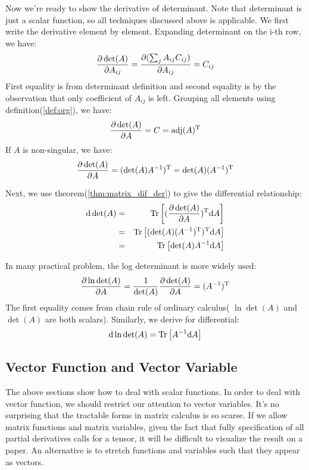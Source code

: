 Now we're ready to show the derivative of determinant. Note that determinant
is just a scalar function, so all techniques discussed above is applicable. 
We first write the derivative element by element. Expanding determinant
on the i-th row, we have:
\begin{equation}
	\dfrac{\partial \det(A)}{\partial A_{ij}} = \dfrac{\partial (\sum_{j}{A_{ij}C_{ij}})}{\partial A_{ij}} = C_{ij}
\end{equation}
First equality is from determinant definition and second equality is 
by the observation that only coefficient of $A_{ij}$ is left. Grouping all 
elements using definition(\ref{def:org}), we have:
\begin{equation}
	\dfrac{\partial \det(A)}{\partial A} = C = \mathrm{adj}(A)^\mathrm{T}
\end{equation}
If $A$ is non-singular, we have:
\begin{equation}
	\dfrac{\partial \det(A)}{\partial A} = (\det(A)A^{-1})^\mathrm{T} =\det(A)(A^{-1})^\mathrm{T} 
\end{equation}

Next, we use theorem(\ref{thm:matrix_dif_der}) to give the differential 
relationship:
\begin{eqnarray}
	\mathrm{d}\det(A) &=& \mathrm{Tr}\left[ (\dfrac{\partial \det(A)}{\partial A})^\mathrm{T} \mathrm{d}A\right] \\
	&=& \mathrm{Tr}\left[ ( \det(A)(A^{-1})^\mathrm{T}  )^\mathrm{T} \mathrm{d}A\right] \\
	&=& \mathrm{Tr}\left[ \det(A)A^{-1}  \mathrm{d}A\right]
\end{eqnarray}

In many practical problem, the log determinant is more widely used:
\begin{eqnarray}
	\dfrac{\partial \ln \det(A)}{\partial A} = \frac{1}{\det(A)} \dfrac{\partial \det(A)}{\partial A} = (A^{-1})^\mathrm{T}
\end{eqnarray}
The first equality comes from chain rule of ordinary calculus(
$\ln \det(A)$ and $\det(A)$ are both scalars). Similarly, we derive
for differential:
\begin{equation}
	\mathrm{d}\ln \det(A) = \mathrm{Tr}\left[ A^{-1}  \mathrm{d}A\right]
\end{equation}
	

\subsection{Vector Function and Vector Variable}

The above sections show how to deal with scalar functions. 
In order to deal with vector function, we should restrict 
our attention to vector variables. It's no surprising that 
the tractable forms in matrix calculus is so scarse. If we 
allow matrix functions and matrix variables, given the fact 
that fully specification of all partial derivatives calls 
for a tensor, it will be difficult to visualize the result
on a paper. An alternative is to stretch functions and variables
such that they appear as vectors. 

